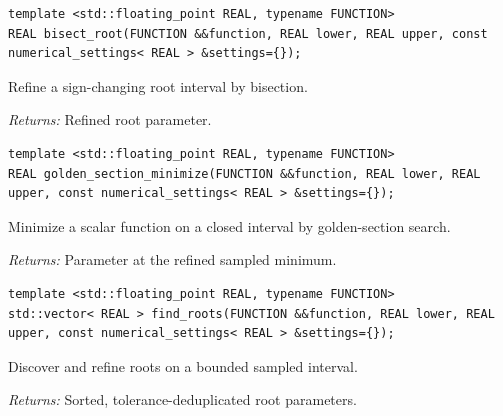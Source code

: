 \par\noindent\begin{minipage}{\linewidth}
\begin{lstlisting}[style=apireference]
template <std::floating_point REAL, typename FUNCTION>
REAL bisect_root(FUNCTION &&function, REAL lower, REAL upper, const numerical_settings< REAL > &settings={});
\end{lstlisting}
{\footnotesize Refine a sign-changing root interval by bisection.\par}
{\footnotesize\textit{Returns:} Refined root parameter.\par}
\end{minipage}\par\vspace{1pt}
\par\noindent\begin{minipage}{\linewidth}
\begin{lstlisting}[style=apireference]
template <std::floating_point REAL, typename FUNCTION>
REAL golden_section_minimize(FUNCTION &&function, REAL lower, REAL upper, const numerical_settings< REAL > &settings={});
\end{lstlisting}
{\footnotesize Minimize a scalar function on a closed interval by golden-section search.\par}
{\footnotesize\textit{Returns:} Parameter at the refined sampled minimum.\par}
\end{minipage}\par\vspace{1pt}
\par\noindent\begin{minipage}{\linewidth}
\begin{lstlisting}[style=apireference]
template <std::floating_point REAL, typename FUNCTION>
std::vector< REAL > find_roots(FUNCTION &&function, REAL lower, REAL upper, const numerical_settings< REAL > &settings={});
\end{lstlisting}
{\footnotesize Discover and refine roots on a bounded sampled interval.\par}
{\footnotesize\textit{Returns:} Sorted, tolerance-deduplicated root parameters.\par}
\end{minipage}\par\vspace{1pt}
